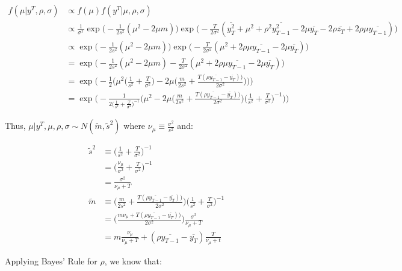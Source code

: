 \documentclass{article}
\begin{document}
\begin{enumerate}
\begin{align*}
f(\mu|y^T, \rho, \sigma) &\propto f(\mu) f(y^T|\mu, \rho, \sigma)\\
&\propto \frac{1}{\sigma^T} \exp \Bigg( - \frac{1}{2s^2} (\mu^2 - 2\mu m) \Bigg) \exp \Bigg( - \frac{T}{2 \sigma^2} (\overline{y_T^2} + \mu^2  + \rho^2 \overline{y_{T-1}^2} - 2\mu \overline{ y_T } - 2 \rho \overline{ z_T} + 2\rho \mu \overline{y_{T-1}})\Bigg)\\
&\propto \exp \Bigg( - \frac{1}{2s^2} (\mu^2 - 2\mu m) \Bigg) \exp \Bigg( - \frac{T}{2 \sigma^2} (\mu^2  + 2\rho \mu \overline{y_{T-1}}- 2\mu \overline{ y_T })\Bigg)\\
&= \exp \Bigg( - \frac{1}{2s^2} (\mu^2 - 2\mu m) - \frac{T}{2 \sigma^2} (\mu^2  + 2\rho \mu \overline{y_{T-1}}- 2\mu \overline{ y_T })\Bigg)\\
&= \exp \Bigg(- \frac{1}{2}\Bigg(\mu^2\Bigg(\frac{1}{s^2} + \frac{T}{\sigma^2} \Bigg) - 2\mu \Bigg(\frac{m}{2s^2} + \frac{T(\rho  \overline{y_{T-1}}- \overline{ y_T }))}{2 \sigma^2} \Bigg)\Bigg)\Bigg)\\
&= \exp \Bigg(- \frac{1}{2\Big(\frac{1}{s^2} + \frac{T}{\sigma^2} \Big)^{-1}}\Bigg(\mu^2 - 2\mu \Bigg(\frac{m}{2s^2} + \frac{T(\rho  \overline{y_{T-1}}- \overline{ y_T }))}{2 \sigma^2} \Bigg)\Bigg(\frac{1}{s^2} + \frac{T}{\sigma^2} \Bigg)^{-1}\Bigg)\Bigg)
\end{align*}

Thus, $\mu| y^T, \mu, \rho, \sigma \sim N(\tilde{m}, \tilde{s}^2)$ where $\nu_\mu\equiv \frac{\sigma^2}{s^2}$ and:

\begin{align*}
\tilde{s}^2 
&\equiv \Bigg(\frac{1}{s^2} + \frac{T}{\sigma^2} \Bigg)^{-1} \\
&= \Bigg(\frac{\nu_\mu}{\sigma^2} + \frac{T}{\sigma^2} \Bigg)^{-1} \\
&= \frac{\sigma^2}{\nu_\mu+T} \\
\tilde{m} 
&\equiv \Bigg(\frac{m}{2s^2} + \frac{T(\rho  \overline{y_{T-1}}- \overline{ y_T }))}{2 \sigma^2} \Bigg)\Bigg(\frac{1}{s^2} + \frac{T}{\sigma^2} \Bigg)^{-1}\\
&= \Bigg(\frac{m\nu_\mu + T(\rho  \overline{y_{T-1}}- \overline{ y_T }))}{2 \sigma^2} \Bigg) \frac{\sigma^2}{\nu_\mu+T}\\
&= m \frac{\nu_\mu}{\nu_\mu + T} + (\rho  \overline{y_{T-1}}- \overline{ y_T })\frac{T}{\nu_\mu + t}
\end{align*}

\pagebreak

Applying Bayes' Rule for $\rho$, we know that:


\end{enumerate}
\end{document}
